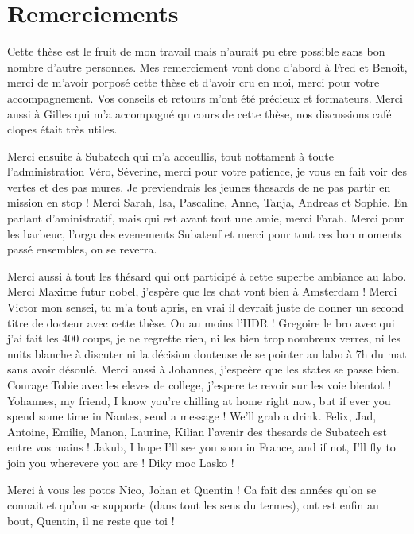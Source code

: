 \documentclass[../main.tex]{subfiles}
\begin{document}
\chapter*{Remerciements}

Cette thèse est le fruit de mon travail mais n'aurait pu etre possible sans bon nombre d'autre personnes. Mes remerciement vont donc d'abord à Fred et Benoit, merci de m'avoir porposé cette thèse et d'avoir cru en moi, merci pour votre accompagnement. Vos conseils et retours m'ont été précieux et formateurs. Merci aussi à Gilles qui m'a accompagné qu cours de cette thèse, nos discussions café clopes était très utiles.

Merci ensuite à Subatech qui m'a acceullis, tout nottament à toute l'administration Véro, Séverine, merci pour votre patience, je vous en fait voir des vertes et des pas mures. Je previendrais les jeunes thesards de ne pas partir en mission en stop ! Merci Sarah, Isa, Pascaline, Anne, Tanja, Andreas et Sophie. En parlant d'aministratif, mais qui est avant tout une amie, merci Farah. Merci pour les barbeuc, l'orga des evenements Subateuf et merci pour tout ces bon moments passé ensembles, on se reverra.

Merci aussi à tout les thésard qui ont participé à cette superbe ambiance au labo. Merci Maxime futur nobel, j'espère que les chat vont bien à Amsterdam ! Merci Victor mon sensei, tu m'a tout apris, en vrai il devrait juste de donner un second titre de docteur avec cette thèse. Ou au moins l'HDR ! Gregoire le bro avec qui j'ai fait les 400 coups, je ne regrette rien, ni les bien trop nombreux verres, ni les nuits blanche à discuter ni la décision douteuse de se pointer au labo à 7h du mat sans avoir désoulé. Merci aussi à Johannes, j'espeère que les states se passe bien. Courage Tobie avec les eleves de college, j'espere te revoir sur les voie bientot ! Yohannes, my friend, I know you're chilling at home right now, but if ever you spend some time in Nantes, send a message ! We'll grab a drink. Felix, Jad, Antoine, Emilie, Manon, Laurine, Kilian l'avenir des thesards de Subatech est entre vos mains ! Jakub, I hope I'll see you soon in France, and if not, I'll fly to join you wherevere you are ! Diky moc Lasko !

Merci à vous les potos Nico, Johan et Quentin ! Ca fait des années qu'on se connait et qu'on se supporte (dans tout les sens du termes), ont est enfin au bout,  Quentin, il ne reste que toi !
\end{document}
